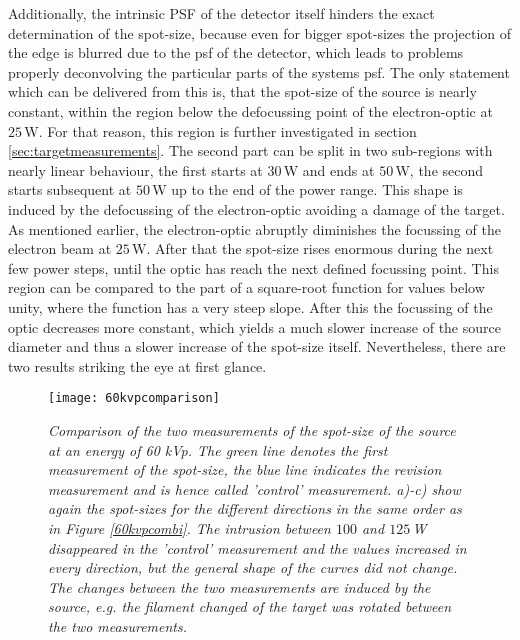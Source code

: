 Additionally, the intrinsic PSF of the detector itself hinders the exact determination of the spot-size, because even for bigger spot-sizes the projection of the edge is blurred due to the \gls{psf} of the detector, which leads to problems properly deconvolving the particular parts of the systems \gls{psf}. 
The only statement which can be delivered from this is, that the spot-size of the source is nearly constant, within the region below the defocussing point of the electron-optic at $25\,$W. For that reason, this region is further investigated in section \ref{sec:targetmeasurements}. The second part can be split in two sub-regions with nearly linear behaviour, the first starts at $30\,$W and ends at $50\,$W, the second starts subsequent at $50\,$W up to the end of the power range. This shape is induced by the defocussing of the electron-optic avoiding a damage of the target. As mentioned earlier, the electron-optic abruptly diminishes the focussing of the electron beam at $25\,$W. After that the spot-size rises enormous during the next few power steps, until the optic has reach the next defined focussing point. This region can be compared to the part of a square-root function for values below unity, where the function has a very steep slope. After this the focussing of the optic decreases more constant, which yields a much slower increase of the source diameter and thus a slower increase of the spot-size itself. Nevertheless, there are two results striking the eye at first glance.
\begin{figure}
	\begin{center}
		\texttt{[image: 60kvpcomparison]}
	\end{center}
	\caption[Comparison of the two spot-size measurements at 60 kVp]{\textit{Comparison of the two measurements of the spot-size of the source at an energy of 60 kVp. The green line denotes the first measurement of the spot-size, the blue line indicates the revision measurement and is hence called 'control' measurement. a)-c) show again the spot-sizes for the different directions in the same order as in Figure \ref{60kvpcombi}. The intrusion between $100$ and $125\,$W disappeared in the 'control' measurement and the values increased in every direction, but the general shape of the curves did not change. The changes between the two measurements are induced by the source, e.g. the filament changed of the target was rotated between the two measurements.}}
	\label{60kvpcomp}
\end{figure}
